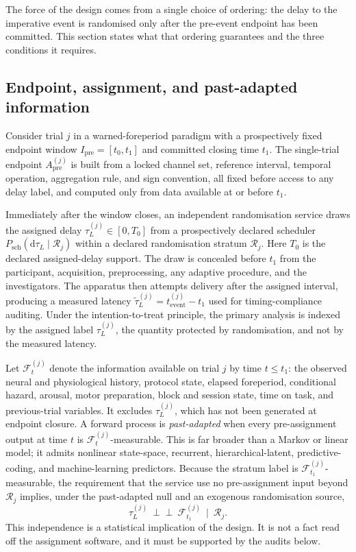 \documentclass[11pt,a4paper]{article}
\theoremstyle{definition}
\newcommand{\F}{\mathcal{F}}
\newcommand{\Apre}{A_{\mathrm{pre}}}
\newcommand{\tauL}{\tau_L}
\begin{document}
The force of the design comes from a single choice of ordering: the delay to the
imperative event is randomised only after the pre-event endpoint has been
committed. This section states what that ordering guarantees and the three
conditions it requires.

\subsection{Endpoint, assignment, and past-adapted information}
\label{sec:boundary-setup}

Consider trial \(j\) in a warned-foreperiod paradigm with a prospectively fixed
endpoint window \(I_{\mathrm{pre}}=[t_0,t_1]\) and committed closing time
\(t_1\). The single-trial endpoint \(\Apre^{(j)}\) is built from a locked channel
set, reference interval, temporal operation, aggregation rule, and sign
convention, all fixed before access to any delay label, and computed only from
data available at or before \(t_1\).

Immediately after the window closes, an independent randomisation service draws
the assigned delay \(\tauL^{(j)}\in[0,T_0]\) from a prospectively declared
scheduler \(P_{\mathrm{sch}}(\mathrm{d}\tauL\mid\mathcal{R}_j)\) within a declared
randomisation stratum \(\mathcal{R}_j\). Here \(T_0\) is the declared assigned-delay
support. The draw is concealed before \(t_1\) from the participant, acquisition,
preprocessing, any adaptive procedure, and the investigators. The apparatus then
attempts delivery after the assigned interval, producing a measured latency
\(\widetilde{\tau}_L^{(j)}=t_{\mathrm{event}}^{(j)}-t_1\) used for
timing-compliance auditing. Under the intention-to-treat principle, the primary
analysis is indexed by the assigned label \(\tauL^{(j)}\), the quantity protected
by randomisation, and not by the measured latency.

Let \(\F_t^{(j)}\) denote the information available on trial \(j\) by time
\(t\leq t_1\): the observed neural and physiological history, protocol state,
elapsed foreperiod, conditional hazard, arousal, motor preparation, block and
session state, time on task, and previous-trial variables. It excludes
\(\tauL^{(j)}\), which has not been generated at endpoint closure. A forward
process is \textit{past-adapted} when every pre-assignment output at time \(t\) is
\(\F_t^{(j)}\)-measurable. This is far broader than a Markov or linear model; it
admits nonlinear state-space, recurrent, hierarchical-latent, predictive-coding,
and machine-learning predictors. Because the stratum label is
\(\F_{t_1}^{(j)}\)-measurable, the requirement that the service use no
pre-assignment input beyond \(\mathcal{R}_j\) implies, under the past-adapted null
and an exogenous randomisation source,
\begin{equation}
\label{eq:tau-filtration-independence}
\tauL^{(j)}\ \perp\!\!\!\perp\ \F_{t_1}^{(j)}\ \mid\ \mathcal{R}_j .
\end{equation}
This independence is a statistical implication of the design. It is not a fact
read off the assignment software, and it must be supported by the audits below.
\end{document}
